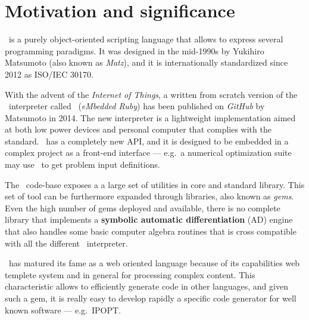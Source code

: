 \section{Motivation and significance}
\label{sec:motivation}

\Ruby~is a purely object-oriented scripting language that allows to express several programming paradigms. It was designed in the mid-1990s by Yukihiro Matsumoto (also known as \emph{Matz}), and it is internationally standardized since 2012 as ISO/IEC 30170.

With the advent of the \emph{Internet of Things}, a written from scratch version of the \Ruby~interpreter called \Mruby~(\emph{eMbedded Ruby}) has been published on \emph{GitHub} by Matsumoto in 2014. The new interpreter is a lightweight implementation aimed at both low power devices and personal computer that complies with the standard. \Mruby~has a completely new API, and it is designed to be embedded in a complex project as a front-end interface --- e.g.\ a numerical optimization suite may use \Mruby~to get problem input definitions.

The \Ruby~code-base exposes a a large set of utilities in core and standard library. This set of tool can be furthermore expanded through libraries, also known as \emph{gems}. Even the high number of gems deployed and available, there is no complete library that implements a \textbf{symbolic automatic differentiation} (AD) engine that also handles some basic computer algebra routines that is cross compatible with all the different \Ruby~interpreter.

\Ruby~has matured its fame as a web oriented language because of its capabilities web templete system and in general for processing complex content. This characteristic allows to efficiently generate code in other languages, and given such a gem, it is really easy to develop rapidly a specific code generator for well known software --- e.g.\ IPOPT\@.

